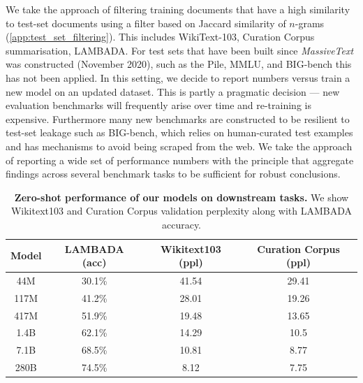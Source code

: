 \documentclass[11pt, a4paper, logo, internal, copyright, nonumbering]{deepmind}
\newcommand{\massivetext}{\textit{MassiveText}\xspace}
\newcommand{\bigbench}{BIG-bench\xspace}
\begin{document}
We take the approach of filtering training documents that have a high similarity to test-set documents using a filter based on Jaccard similarity of $n$-grams (\autoref{app:test_set_filtering}). This includes WikiText-103, Curation Corpus summarisation, LAMBADA.  For test sets that have been built since \massivetext was constructed (November 2020), such as the Pile, MMLU, and \bigbench this has not been applied. In this setting, we decide to report numbers versus train a new model on an updated dataset. This is partly a pragmatic decision --- new evaluation benchmarks will frequently arise over time and re-training is expensive. Furthermore many new benchmarks are constructed to be resilient to test-set leakage such as \bigbench, which relies on human-curated test examples and has mechanisms to avoid being scraped from the web. We take the approach of reporting a wide set of performance numbers with the principle that aggregate findings across several benchmark tasks to be sufficient for robust conclusions. 

\begin{table}[t]
    \centering
    \begin{tabular}{cccc}
    \toprule
        \textbf{Model} & \textbf{LAMBADA (acc)} & \textbf{Wikitext103 (ppl)} &  \textbf{Curation Corpus (ppl)} \\
        \midrule
         44M &  30.1\% & 41.54 & 29.41 \\
         117M & 41.2\% & 28.01 & 19.26 \\
         417M & 51.9\% &  19.48 & 13.65 \\
         1.4B & 62.1\% & 14.29 & 10.5 \\
         7.1B & 68.5\% & 10.81 & 8.77 \\
         280B & 74.5\% & 8.12 & 7.75  \\
     \bottomrule
    \end{tabular}
    \caption{\textbf{Zero-shot performance of our models on downstream tasks.} We show Wikitext103  and Curation Corpus validation perplexity along with LAMBADA accuracy.
    }
    \label{tab:perf}
\end{table}
\end{document}

